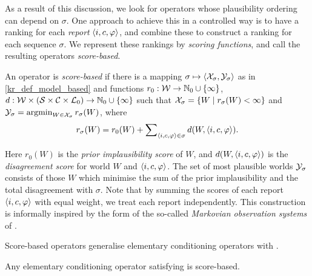 
As a result of this discussion, we look for operators whose plausibility
ordering can depend on $\sigma$. One approach to achieve this in a controlled
way is to have a ranking for each
\emph{report} $\langle {i, c, \varphi} \rangle$, and combine these to construct a ranking
for each sequence $\sigma$. We represent these rankings by \emph{scoring
functions}, and call the resulting operators \emph{score-based}.


\begin{definition}
\label{kr_def_score_based}
    An operator is \emph{score-based} if there is a mapping $\sigma \mapsto
    \langle {\mathcal{X}_\sigma, \mathcal{Y}_\sigma} \rangle$ as in \cref{kr_def_model_based} and functions
    $r_0: \mathcal{W} \to \mathbb{N}_0 \cup \{\infty\}$, $d: \mathcal{W} \times (\mathcal{S} \times \mathcal{C} \times \mathcal{L}{}_0) \to \mathbb{N}_0 \cup \{\infty\}$
    such that $\mathcal{X}_\sigma = \{W \mid r_\sigma(W) < \infty\}$ and $\Y_\sigma =
    \argmin_{W \in \X_\sigma}{r_\sigma(W)}$, where
    \[
        r_\sigma(W) = r_0(W) + \sum\nolimits_{\langle {i, c, \varphi} \rangle \in \sigma}{
            d(W, \langle {i, c, \varphi} \rangle)
        }.
    \]

\end{definition}

Here $r_0(W)$ is the \emph{prior implausibility score} of $W$, and $d(W,
\langle {i, c, \varphi} \rangle)$ is the \emph{disagreement score} for world $W$ and $\langle {i,
c, \varphi} \rangle$. The set of most plausible worlds $\mathcal{Y}_\sigma$ consists of those $W$
which minimise the sum of the prior implausibility and the total
disagreement with $\sigma$. Note that by summing the scores
of each report $\langle {i, c, \varphi} \rangle$ with equal weight, we treat each report independently.
This construction is informally inspired by the form of the so-called
\emph{Markovian observation systems} of \textcite[Eq.
(5)]{boutilier1998belief}.

Score-based operators generalise elementary conditioning operators with \kconj{}.

\begin{proposition}
\label{kr_prop_kconj_conditioning_implies_score_based}
    Any elementary conditioning operator satisfying \kconj{} is score-based.
\end{proposition}

